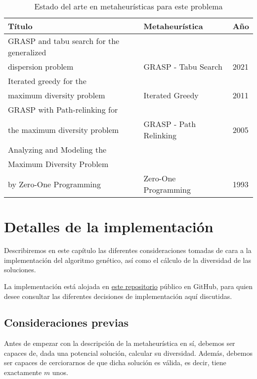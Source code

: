 \begin{table}[t]
    \centering
    \begin{tabular}{lll}
        \toprule
        \textbf{Título} & \textbf{Metaheurística} & \textbf{Año} \\ \midrule
        GRASP and tabu search for the generalized \\ dispersion problem \cite{grasptabu} & GRASP - Tabu Search & 2021 \\ \midrule
        Iterated greedy for the \\ maximum diversity problem \cite{iteratedgreedylozano} & Iterated Greedy &  2011 \\  \midrule
        GRASP with Path-relinking for \\ the maximum diversity problem \cite{grasppathrelinking} & GRASP - Path Relinking & 2005 \\ \midrule
        Analyzing and Modeling the \\ Maximum Diversity Problem \\ by Zero-One Programming \cite{nphard} & Zero-One Programming & 1993 \\
        \bottomrule
    \end{tabular}
    \caption{Estado del arte en metaheurísticas para este problema}
    \label{tab:stateart}
\end{table}




\chapter{Detalles de la implementación}

Describiremos en este capítulo las diferentes consideraciones tomadas de cara a la implementación del algoritmo genético, así como el cálculo de la diversidad de las soluciones.

La implementación está alojada en \href{https://github.com/jesi-rgb/genetic-mdp}{este repositorio} público en GitHub, para quien desee consultar las diferentes decisiones de implementación aquí discutidas.

\section{Consideraciones previas}
Antes de empezar con la descripción de la metaheurística en sí, debemos ser capaces de, dada una potencial solución, calcular su diversidad. Además, debemos ser capaces de cerciorarnos de que dicha solución es válida, es decir, tiene exactamente $m$ unos.

